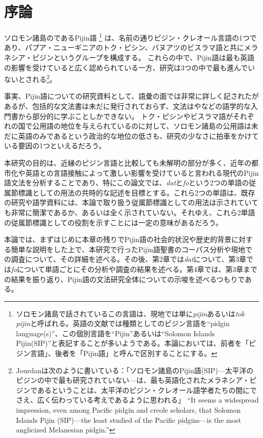 \chapter{序論}

ソロモン諸島のであるPijin語
\footnote{ソロモン諸島で話されているこの言語は、現地では単に\textit{pijin}あるいは\textit{tok pijin}と呼ばれる。英語の文献では種類としてのピジン言語を``pidgin language(s)''、この個別言語を``Pijin''あるいは``Solomon Islands Pijin(SIP)''と表記することが多いようである。本論においては、前者を「ピジン言語」、後者を「Pijin語」と呼んで区別することにする。}
は、名前の通りピジン・クレオール言語の1つであり、パプア・ニューギニアのトク・ピシン、バヌアツのビスラマ語と共にメラネシア・ピジンというグループを構成する。
これらの中で、Pijin語は最も英語の影響を受けていると広く認められている一方、研究は3つの中で最も進んでいないとされる\footnote{
  Jourdanは次のように書いている：「ソロモン諸島のPijin語(SIP)---太平洋のピジンの中で最も研究されていない---は、最も英語化されたメラネシア・ピジンであるということは、太平洋のピジン・クレオール語学者たちの間にでさえ、広く伝わっている考えであるように思われる」
  ``It seems a widespread impression, even among Pacific pidgin and creole scholars, that Solomon Islands Pijin (SIP)---the least studied of the Pacific pidgins---is the most anglicized Melanesian pidgin.''\citep{nativization}
}\citep{nativization}。

事実、Pijin語についての研究資料として、語彙の面では非常に詳しく記された\cite{dictionary}があるが、包括的な文法書は未だに発行されておらず\citep{phonology}、文法は\cite{yumi}や\cite{eric}などの語学的な入門書から部分的に学ぶことしかできない。
トク・ピシンやビスラマ語がそれぞれの国で公用語の地位を与えられているのに対して、ソロモン諸島の公用語は未だに英語のみであるという政治的な地位の低さも、研究の少なさに拍車をかけている要因の1つといえるだろう。

本研究の目的は、近縁のピジン言語と比較しても未解明の部分が多く、近年の都市化や英語との言語接触によって激しい影響を受けていると言われる現代のPijin語文法を分析することであり、特にこの論文では、\textit{dat}と\textit{fo}という2つの単語の従属節標識としての用法の共時的な記述を目標とする。これら2つの単語は、既存の研究や語学資料には、本論で取り扱う従属節標識としての用法は示されていても非常に簡潔であるか、あるいは全く示されていない。それゆえ、これら2単語の従属節標識としての役割を示すことには一定の意味があるだろう。

本論では、まずはじめに本章の残りでPijin語の社会的状況や歴史的背景に対する簡単な説明をした上で、本研究で行ったPijin語聖書のコーパス分析や現地での調査について、その詳細を述べる。その後、第2章では\textit{dat}について、第3章では\textit{fo}について単語ごとにその分析や調査の結果を述べる。第4章では、第3章までの結果を振り返り、Pijin語の文法研究全体についての示唆を述べるつもりである。

